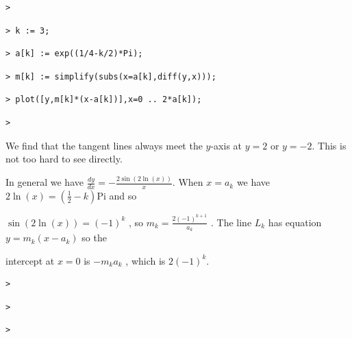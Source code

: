 \documentclass{article}
\begin{document}
\begin{lstlisting}
> 
\end{lstlisting}
\begin{lstlisting}
> k := 3;
\end{lstlisting}
\begin{lstlisting}
> a[k] := exp((1/4-k/2)*Pi);
\end{lstlisting}
\begin{lstlisting}
> m[k] := simplify(subs(x=a[k],diff(y,x)));
\end{lstlisting}
\begin{lstlisting}
> plot([y,m[k]*(x-a[k])],x=0 .. 2*a[k]);
\end{lstlisting}
\begin{lstlisting}
> 
\end{lstlisting}
\begin{Maple Normal}
We find that the tangent lines always meet the 
$y $-axis at 
$y =2$ or 
$y =-2$.  This is not too hard to see directly.\

In general we have 
$\frac{\mathit{dy}}{\mathit{dx}}=-\frac{2 \sin (2 \ln (x))}{x}$.  When 
$x =a_{k}$ we have 
$2 \ln (x)=(\frac{1}{2}-k) \mathrm{Pi}$ and so\

 
$\sin (2 \ln (x))=(-1)^{k}$   , so  
$m_{k}=\frac{2 (-1)^{k +1}}{a_{k}}$  .   The line 
$L_{k}$ has equation 
$y =m_{k} (x -a_{k})$ so the\

intercept at 
$x =0$ is 
$-m_{k} a_{k}$  , which is 
$2 (-1)^{k}$.
\end{Maple Normal}
\begin{Maple Normal}
 
\end{Maple Normal}
\begin{lstlisting}
> 
\end{lstlisting}
\begin{lstlisting}
> 
\end{lstlisting}
\begin{lstlisting}
> 
\end{lstlisting}
\end{document}
